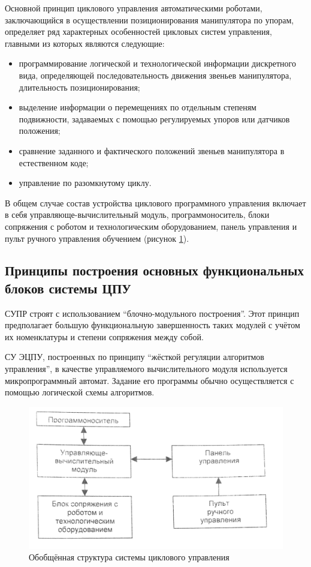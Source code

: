 Основной принцип циклового управления автоматическими роботами, заключающийся в осуществлении позиционирования манипулятора по упорам, определяет ряд характерных особенностей цикловых систем управления, главными из которых являются следующие:

\begin{itemize}
    \item программирование логической и технологической информации дискретного вида, определяющей последовательность движения звеньев манипулятора, длительность позиционирования;
    \item выделение информации о перемещениях по отдельным степеням подвижности, задаваемых с помощью регулируемых упоров или датчиков положения;
    \item сравнение заданного и фактического положений звеньев манипулятора в естественном коде;
    \item управление по разомкнутому циклу.
\end{itemize}

В общем случае состав устройства циклового программного управления включает в себя управляюще-вычислительный модуль, программоноситель, блоки сопряжения с роботом и технологическим оборудованием, панель управления и пульт ручного управления обучением (рисунок \ref{fig:commonstructure}).

\subsection*{Принципы построения основных функциональных блоков системы ЦПУ}

СУПР строят с использованием ``блочно-модульного построения''. Этот принцип предполагает большую функциональную завершенность таких модулей с учётом их номенклатуры и степени сопряжения между собой.

СУ ЭЦПУ, построенных по принципу ``жёсткой регуляции алгоритмов управления'', в качестве управляемого вычислительного модуля используется микропрограммный автомат. Задание его программы обычно осуществляется с помощью логической схемы алгоритмов.

\begin{figure}[ht]
    \includegraphics[width=.6\linewidth]{Figures/commonstructure.png}
    \caption{Обобщённая структура системы циклового управления}
    \label{fig:commonstructure}
\end{figure}

